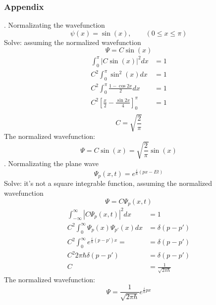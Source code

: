 \begin{frame}[allowframebreaks=]
    \frametitle{Appendix}
    . Normalizating the wavefunction \[\psi(x)=\sin(x), \qquad (0\le x \le \pi)\]
    \alert{Solve:} assuming the normalized wavefunction 
    \[\Psi=C\sin(x)\]
    \begin{equation*}
        \begin{split}
            \int_0 ^\pi |C\sin(x)|^2 dx &=1 \\
            C^2 \int_0 ^\pi \sin^2(x) dx &=1 \\
            C^2 \int_0 ^\pi \frac{1-\cos 2x }{2} dx &=1 \\ 
            C^2 [\frac{x}{2}-\frac{\sin 2x}{4}]_0 ^\pi &=1 \\ 
        \end{split} 
     \end{equation*}
     \[C=\sqrt{\frac{2}{\pi}}\]
     The normalized wavefunction:
     \begin{equation*}
        \Psi=C\sin(x)=\sqrt{\frac{2}{\pi}}\sin(x)
    \end{equation*}
    . Normalizating the plane wave \[\Psi_p (x,t)=e^{\frac{i}{\hbar}(px-Et)} \] 
    \alert{Solve:} it's not a square integrable function, assuming the normalized wavefunction 
    \[\Psi=C\Psi_p (x,t)\]
    \begin{equation*}
        \begin{split}
            \int_{-\infty} ^\infty |C\Psi_p (x,t)|^2 dx &=1  \\
            C^2 \int_0 ^\infty \Psi_p (x) \Psi_{p'} (x) dx &=\delta (p-p')  \\
            C^2 \int_0 ^\infty e^{\frac{i}{\hbar}(p-p')x} =&=\delta (p-p')\\
            C^2 2\pi \hbar \delta (p-p') &=\delta(p-p') \\
            C&= \frac{1}{\sqrt{2\pi \hbar}}
        \end{split} 
     \end{equation*}
     The normalized wavefunction:
     \begin{equation*}
        \Psi=\frac{1}{\sqrt{2\pi \hbar}} e^{\frac{i}{\hbar}px}
    \end{equation*}  
\end{frame}

